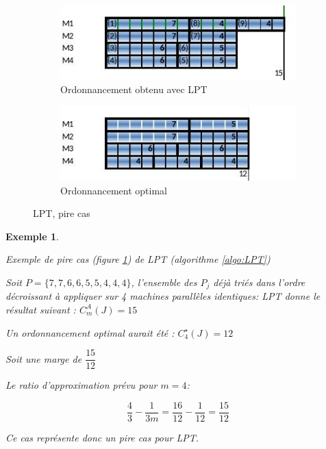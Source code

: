 \documentclass[a4paper,12pt]{report}
\theoremstyle{plain}				%
\newtheorem{example}{Exemple}
\theoremstyle{definition}				%
\begin{document}
\begin{figure}
{\centering}
	\begin{subfigure}[b]{0.45\linewidth}
    \includegraphics[width=\linewidth]
    {Biblio_PCmax_Rendu_exLPT_Rev1.jpg}
    \caption{Ordonnancement obtenu avec LPT}
  	\end{subfigure}
\hfill%
	\begin{subfigure}[b]{0.45\linewidth}
    \includegraphics[width=\linewidth]
    {Biblio_PCmax_Rendu_exLPT_Rev2.jpg}
    \caption{Ordonnancement optimal}
  	\end{subfigure}
  	\caption{LPT, pire cas}
  	\label{ex:LPTExemplePireCas}
\end{figure}

\begin{example}
\begin{flushleft}
Exemple de pire cas (figure \ref{ex:LPTExemplePireCas}) de LPT (algorithme \ref{algo:LPT})

Soit $P=\{7,7,6,6,5,5,4,4,4\}$, l'ensemble des $P_j$ déjà triés dans
l'ordre décroissant à appliquer sur 4 machines parallèles identiques:
\bigskip
LPT donne le résultat suivant : $C_m^A(J) = 15$
\bigskip

Un ordonnancement optimal aurait été : $C_4^{\star}(J)=12$

Soit une marge de $\dfrac{15}{12}$

Le ratio d'approximation prévu pour $m=4$:

\[
  \dfrac{4}{3} - \dfrac{1}{3m}=\dfrac{16}{12} - \dfrac{1}{12}=\dfrac{15}{12}
\]

Ce cas représente donc un pire cas pour LPT.
\end{flushleft}
\end{example}
\end{document}

